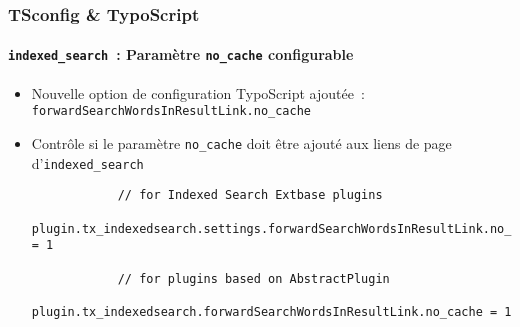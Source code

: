 \begin{frame}[fragile]
	\frametitle{TSconfig \& TypoScript}
	\framesubtitle{\texttt{indexed\_search}~: Paramètre \texttt{no\_cache} configurable}

	\lstset{basicstyle=\tiny\ttfamily}

	\begin{itemize}

		\item Nouvelle option de configuration TypoScript ajoutée~:\newline
			 \texttt{forwardSearchWordsInResultLink.no\_cache}

		\item Contrôle si le paramètre \texttt{no\_cache} doit être ajouté aux liens de page
			d'\texttt{indexed\_search}

		\begin{lstlisting}
			// for Indexed Search Extbase plugins
			plugin.tx_indexedsearch.settings.forwardSearchWordsInResultLink.no_cache = 1

			// for plugins based on AbstractPlugin
			plugin.tx_indexedsearch.forwardSearchWordsInResultLink.no_cache = 1
		\end{lstlisting}

	\end{itemize}

\end{frame}

